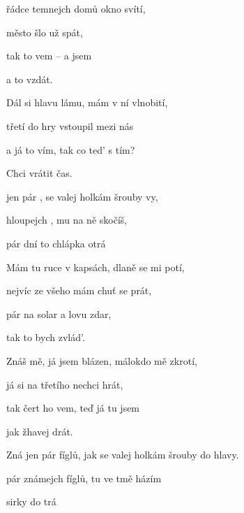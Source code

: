 

       

\zs
{} řádce temnejch domů  okno svítí,

 město šlo už  spát,

tak  to vem -- a  jsem

a  to vzdát.
\ks

\zs
Dál si hlavu lámu, mám v ní vlnobití,

třetí do hry vstoupil mezi nás

a já to vím, tak co ted’ s tím?

Chci vrátit čas.
\ks

\zr
{} jen pár ,
 se valej holkám šrouby vy,

 hloupejch ,
 mu na ně skočíš,

 pár dní to chlápka otrá
      
\kr

\zs
Mám tu ruce v kapsách, dlaně se mi potí,

nejvíc ze všeho mám chuť se prát,

pár na solar a lovu zdar,

tak to bych zvlád'.
\ks

\zs
Znáš mě, já jsem blázen, málokdo mě zkrotí,

já si na třetího nechci hrát,

tak čert ho vem, teď já tu jsem

jak žhavej drát.
\ks

\zr  \kr

\zr
Zná jen pár fíglů,
jak se valej holkám šrouby do hlavy.

pár známejch fíglů,
 tu ve tmě házím

 sirky do trá
\kr

\kp
